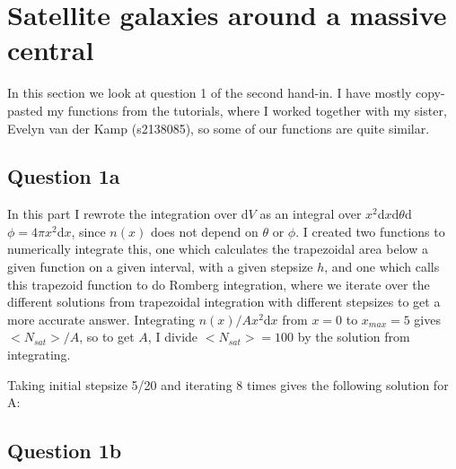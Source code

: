 \section{Satellite galaxies around a massive central}

In this section we look at question 1 of the second hand-in. 
I have mostly copy-pasted my functions from the tutorials, where I worked together with my sister,
Evelyn van der Kamp (s2138085), so some of our functions are quite similar.



\subsection{Question 1a}

In this part I rewrote the integration over d$V$ as an integral over $x^2$d$x$d$\theta$d$\phi = 4\pi x^2$d$x$, since $n(x)$ does not depend on $\theta$ or $\phi$. 
I created two functions to numerically integrate this, one which calculates the trapezoidal area below a given function on a given interval, with a given stepsize $h$, and one which calls this trapezoid function to do Romberg integration, where we iterate over the different solutions from trapezoidal integration with different stepsizes to get a more accurate answer.
Integrating $n(x)/A x^2$d$x$ from $x = 0$ to $x_{max} = 5$ gives $<N_{sat}>/A$, so to get $A$, I divide $<N_{sat}> = 100$ by the solution from integrating. 

Taking initial stepsize 5/20 and iterating 8 times gives the following solution for A:




\subsection{Question 1b}

